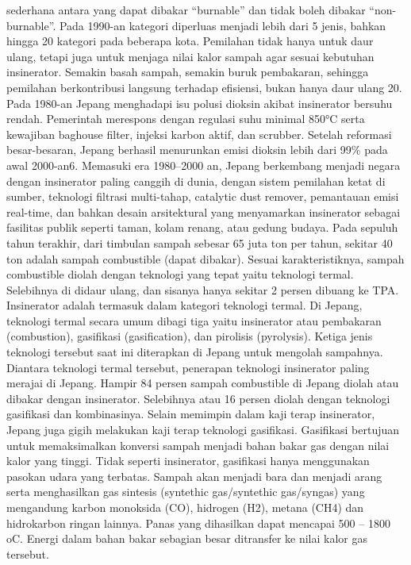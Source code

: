 \documentclass[
  letterpaper,
  DIV=11,
  numbers=noendperiod]{scrreprt}
\begin{document}
sederhana antara yang dapat dibakar ``burnable'' dan tidak boleh dibakar
``non-burnable''. Pada 1990-an kategori diperluas menjadi lebih dari 5
jenis, bahkan hingga 20 kategori pada beberapa kota. Pemilahan tidak
hanya untuk daur ulang, tetapi juga untuk menjaga nilai kalor sampah
agar sesuai kebutuhan insinerator. Semakin basah sampah, semakin buruk
pembakaran, sehingga pemilahan berkontribusi langsung terhadap
efisiensi, bukan hanya daur ulang 20. Pada 1980-an Jepang menghadapi isu
polusi dioksin akibat insinerator bersuhu rendah. Pemerintah merespons
dengan regulasi suhu minimal 850°C serta kewajiban baghouse filter,
injeksi karbon aktif, dan scrubber. Setelah reformasi besar-besaran,
Jepang berhasil menurunkan emisi dioksin lebih dari 99\% pada awal
2000-an6. Memasuki era 1980--2000 an, Jepang berkembang menjadi negara
dengan insinerator paling canggih di dunia, dengan sistem pemilahan
ketat di sumber, teknologi filtrasi multi-tahap, catalytic dust remover,
pemantauan emisi real-time, dan bahkan desain arsitektural yang
menyamarkan insinerator sebagai fasilitas publik seperti taman, kolam
renang, atau gedung budaya. Pada sepuluh tahun terakhir, dari timbulan
sampah sebesar 65 juta ton per tahun, sekitar 40 ton adalah sampah
combustible (dapat dibakar). Sesuai karakteristiknya, sampah combustible
diolah dengan teknologi yang tepat yaitu teknologi termal. Selebihnya di
didaur ulang, dan sisanya hanya sekitar 2 persen dibuang ke TPA.
Insinerator adalah termasuk dalam kategori teknologi termal. Di Jepang,
teknologi termal secara umum dibagi tiga yaitu insinerator atau
pembakaran (combustion), gasifikasi (gasification), dan pirolisis
(pyrolysis). Ketiga jenis teknologi tersebut saat ini diterapkan di
Jepang untuk mengolah sampahnya. Diantara teknologi termal tersebut,
penerapan teknologi insinerator paling merajai di Jepang. Hampir 84
persen sampah combustible di Jepang diolah atau dibakar dengan
insinerator. Selebihnya atau 16 persen diolah dengan teknologi
gasifikasi dan kombinasinya. Selain memimpin dalam kaji terap
insinerator, Jepang juga gigih melakukan kaji terap teknologi
gasifikasi. Gasifikasi bertujuan untuk memaksimalkan konversi sampah
menjadi bahan bakar gas dengan nilai kalor yang tinggi. Tidak seperti
insinerator, gasifikasi hanya menggunakan pasokan udara yang terbatas.
Sampah akan menjadi bara dan menjadi arang serta menghasilkan gas
sintesis (syntethic gas/syntethic gas/syngas) yang mengandung karbon
monoksida (CO), hidrogen (H2), metana (CH4) dan hidrokarbon ringan
lainnya. Panas yang dihasilkan dapat mencapai 500 -- 1800 oC. Energi
dalam bahan bakar sebagian besar ditransfer ke nilai kalor gas tersebut.
\end{document}
